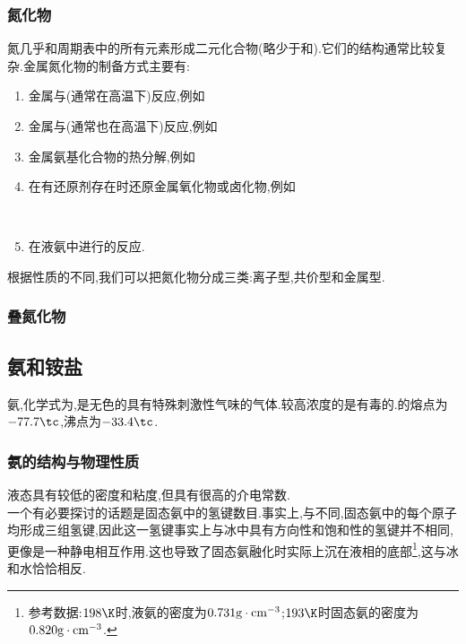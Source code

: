 \documentclass{ctexart}
\begin{document}
\subsubsection{氮化物}
氮几乎和周期表中的所有元素形成二元化合物(略少于和).它们的结构通常比较复杂.金属氮化物的制备方式主要有:
\begin{enumerate}[label=\tbf{\arabic*.},topsep=0pt,parsep=0pt,itemsep=0pt,partopsep=0pt]
    \item 金属与(通常在高温下)反应,例如
        \begin{center}
        \end{center}
    \item 金属与(通常也在高温下)反应,例如
        \begin{center}
        \end{center}
    \item 金属氨基化合物的热分解,例如
        \begin{center}
        \end{center}
    \item 在有还原剂存在时还原金属氧化物或卤化物,例如
        \begin{center}
            \\
        \end{center}
    \item 在液氨中进行的反应.
\end{enumerate}
根据性质的不同,我们可以把氮化物分成三类:离子型,共价型和金属型.
\subsubsection{叠氮化物}
\subsection{氨和铵盐}
\begin{substance}[\ce{NH3}]
    氨,化学式为,是无色的具有特殊刺激性气味的气体.较高浓度的是有毒的.的熔点为$-77.7\tc$,沸点为$-33.4\tc$.
\end{substance}
\subsubsection{氨的结构与物理性质}
液态具有较低的密度和粘度,但具有很高的介电常数.\\
\indent 一个有必要探讨的话题是固态氨中的氢键数目.事实上,与不同,固态氨中的每个原子均形成三组氢键,因此这一氢键事实上与冰中具有方向性和饱和性的氢键并不相同,更像是一种静电相互作用.这也导致了固态氨融化时实际上沉在液相的底部\footnote{参考数据:$198\K$时,液氨的密度为$0.731\text g\cdot\text{cm}^{-3}$;$193\K$时固态氨的密度为$0.820\text g\cdot\text{cm}^{-3}$.},这与冰和水恰恰相反.
\end{document}
